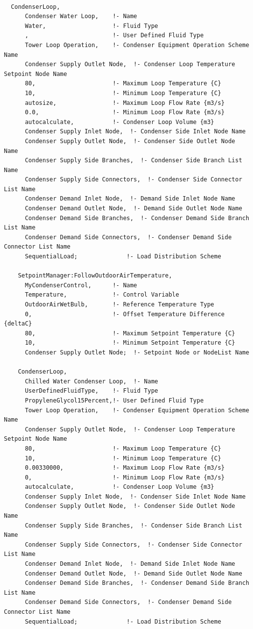 \begin{lstlisting}

  CondenserLoop,
      Condenser Water Loop,    !- Name
      Water,                   !- Fluid Type
      ,                        !- User Defined Fluid Type
      Tower Loop Operation,    !- Condenser Equipment Operation Scheme Name
      Condenser Supply Outlet Node,  !- Condenser Loop Temperature Setpoint Node Name
      80,                      !- Maximum Loop Temperature {C}
      10,                      !- Minimum Loop Temperature {C}
      autosize,                !- Maximum Loop Flow Rate {m3/s}
      0.0,                     !- Minimum Loop Flow Rate {m3/s}
      autocalculate,           !- Condenser Loop Volume {m3}
      Condenser Supply Inlet Node,  !- Condenser Side Inlet Node Name
      Condenser Supply Outlet Node,  !- Condenser Side Outlet Node Name
      Condenser Supply Side Branches,  !- Condenser Side Branch List Name
      Condenser Supply Side Connectors,  !- Condenser Side Connector List Name
      Condenser Demand Inlet Node,  !- Demand Side Inlet Node Name
      Condenser Demand Outlet Node,  !- Demand Side Outlet Node Name
      Condenser Demand Side Branches,  !- Condenser Demand Side Branch List Name
      Condenser Demand Side Connectors,  !- Condenser Demand Side Connector List Name
      SequentialLoad;              !- Load Distribution Scheme

    SetpointManager:FollowOutdoorAirTemperature,
      MyCondenserControl,      !- Name
      Temperature,             !- Control Variable
      OutdoorAirWetBulb,       !- Reference Temperature Type
      0,                       !- Offset Temperature Difference {deltaC}
      80,                      !- Maximum Setpoint Temperature {C}
      10,                      !- Minimum Setpoint Temperature {C}
      Condenser Supply Outlet Node;  !- Setpoint Node or NodeList Name

    CondenserLoop,
      Chilled Water Condenser Loop,  !- Name
      UserDefinedFluidType,    !- Fluid Type
      PropyleneGlycol15Percent,!- User Defined Fluid Type
      Tower Loop Operation,    !- Condenser Equipment Operation Scheme Name
      Condenser Supply Outlet Node,  !- Condenser Loop Temperature Setpoint Node Name
      80,                      !- Maximum Loop Temperature {C}
      10,                      !- Minimum Loop Temperature {C}
      0.00330000,              !- Maximum Loop Flow Rate {m3/s}
      0,                       !- Minimum Loop Flow Rate {m3/s}
      autocalculate,           !- Condenser Loop Volume {m3}
      Condenser Supply Inlet Node,  !- Condenser Side Inlet Node Name
      Condenser Supply Outlet Node,  !- Condenser Side Outlet Node Name
      Condenser Supply Side Branches,  !- Condenser Side Branch List Name
      Condenser Supply Side Connectors,  !- Condenser Side Connector List Name
      Condenser Demand Inlet Node,  !- Demand Side Inlet Node Name
      Condenser Demand Outlet Node,  !- Demand Side Outlet Node Name
      Condenser Demand Side Branches,  !- Condenser Demand Side Branch List Name
      Condenser Demand Side Connectors,  !- Condenser Demand Side Connector List Name
      SequentialLoad;              !- Load Distribution Scheme
\end{lstlisting}

